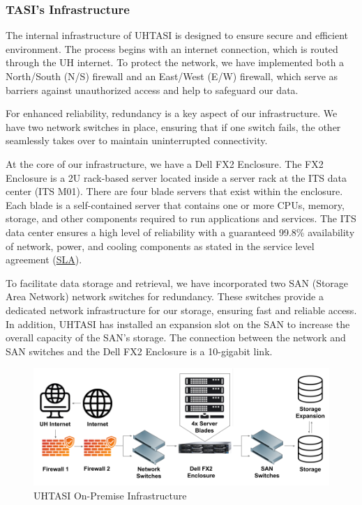 \subsubsection{TASI's Infrastructure}
\label{TASI's Infrastructure Section Header}

The internal infrastructure of UHTASI is designed to ensure secure and efficient environment. The process begins with an internet connection, which is routed through the UH internet. To protect the network, we have implemented both a North/South (N/S) firewall and an East/West (E/W) firewall, which serve as barriers against unauthorized access and help to safeguard our data.

For enhanced reliability, redundancy is a key aspect of our infrastructure. We have two network switches in place, ensuring that if one switch fails, the other seamlessly takes over to maintain uninterrupted connectivity.

At the core of our infrastructure, we have a Dell FX2 Enclosure. The FX2 Enclosure is a 2U rack-based server located inside a server rack at the ITS data center (ITS M01). There are four blade servers that exist within the enclosure. Each blade is a self-contained server that contains one or more CPUs, memory, storage, and other components required to run applications and services. The ITS data center ensures a high level of reliability with a guaranteed 99.8\% availability of network, power, and cooling components as stated in the service level agreement (\href{https://www.hawaii.edu/its/docs/CoLocationSLA.pdf}{SLA}).

To facilitate data storage and retrieval, we have incorporated two SAN (Storage Area Network) network switches for redundancy. These switches provide a dedicated network infrastructure for our storage, ensuring fast and reliable access. In addition, UHTASI has installed an expansion slot on the SAN to increase the overall capacity of the SAN's storage. The connection between the network and SAN switches and the Dell FX2 Enclosure is a 10-gigabit link.

\begin{figure}[H]
    \centering
    \includegraphics[scale = 0.64]{images/UHTASI Infrastructure.png}
    \caption{UHTASI On-Premise Infrastructure}
    \label{UHTASI-INF}
\end{figure}

